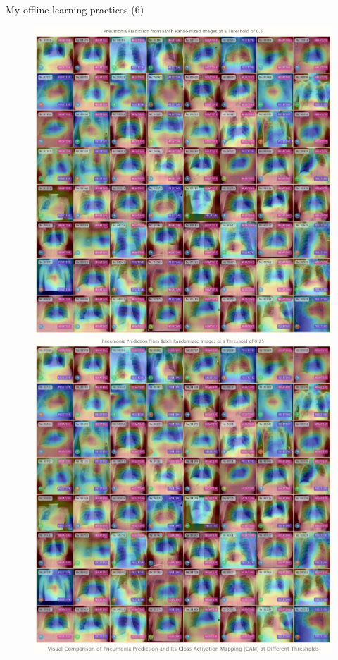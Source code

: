 \documentclass{beamer}
\begin{document}
	\begin{frame}[fragile]{My offline learning practices (6)}
		\begin{figure}[!htb]
			\vspace{-.25em}
			\endminipage\hfill
			\centering\includegraphics[width=\linewidth]{images/deep_learning_6_1_1.png}
			\endminipage\hfill
			\centering\includegraphics[width=\linewidth]{images/deep_learning_6_1_2.png}

\end{figure}
\end{frame}
\end{document}
